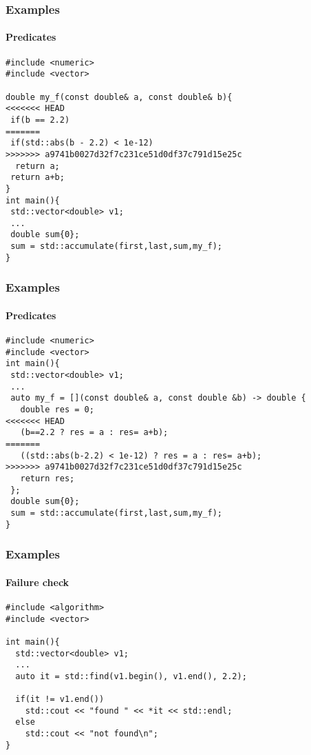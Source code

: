 \begin{frame}[fragile]
  \frametitle{Examples}
  \framesubtitle{Predicates}
\begin{lstlisting}
#include <numeric>
#include <vector>

double my_f(const double& a, const double& b){
<<<<<<< HEAD
 if(b == 2.2)
=======
 if(std::abs(b - 2.2) < 1e-12)
>>>>>>> a9741b0027d32f7c231ce51d0df37c791d15e25c
  return a;
 return a+b;
}
int main(){
 std::vector<double> v1;
 ...
 double sum{0};
 sum = std::accumulate(first,last,sum,my_f);
}
\end{lstlisting}

\end{frame}


\begin{frame}[fragile]
  \frametitle{Examples}
  \framesubtitle{Predicates}
\begin{lstlisting}
#include <numeric>
#include <vector>
int main(){
 std::vector<double> v1;
 ...
 auto my_f = [](const double& a, const double &b) -> double {
   double res = 0;
<<<<<<< HEAD
   (b==2.2 ? res = a : res= a+b);
=======
   ((std::abs(b-2.2) < 1e-12) ? res = a : res= a+b);
>>>>>>> a9741b0027d32f7c231ce51d0df37c791d15e25c
   return res;
 };
 double sum{0};
 sum = std::accumulate(first,last,sum,my_f);
}
\end{lstlisting}

\end{frame}

\begin{frame}[fragile]
  \frametitle{Examples}
  \framesubtitle{Failure check}
\begin{lstlisting}
#include <algorithm>
#include <vector>
  
int main(){
  std::vector<double> v1;
  ...
  auto it = std::find(v1.begin(), v1.end(), 2.2);

  if(it != v1.end())
    std::cout << "found " << *it << std::endl;
  else
    std::cout << "not found\n";
}
  
\end{lstlisting}
\end{frame}
